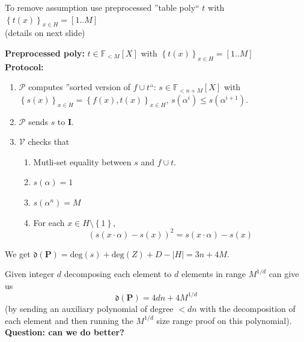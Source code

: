 \documentclass[shadesubsections,compress,14pt,mathserif]{beamer}
\newcommand{\prot}{\mathbf{P}}
\newcommand{\aggdeg}[1]{\mathfrak{d}(#1)}
\renewcommand{\deg}{\mathrm{deg}}
\newcommand{\F}{\ensuremath{\mathbb F}}
\newcommand{\set}[1]{\ensuremath{\left\{#1\right\}}}
\newcommand{\sett}[2]{\ensuremath{\left\{#1\right\}_{#2}}}
\newcommand{\ver}{\ensuremath{\mathcal{V}}}
\newcommand{\prv}{\ensuremath{\mathcal{P}}}
\newcommand{\polysofdeg}[1]{\F_{< #1}[X]}
\newcommand{\ideal}{\mathbf{I}}
\begin{document}
\begin{frame}
To remove assumption use preprocessed ''table poly`` $t$ with $\sett{t(x)}{x\in H}=[1..M]$\\
(details on next slide)
 \vspace{0.2in}



\end{frame}

\begin{frame}

\textbf{Preprocessed poly:} $t\in \polysofdeg{M}$ with $\sett{t(x)}{x\in H}=[1..M]$ \\ \pause
\textbf{Protocol:}
 \begin{enumerate}
 \item $\prv$ computes ''sorted version of $f\cup t$``: $s\in \polysofdeg{n+M}$ with
 $\sett{s(x)}{x\in H}=\sett{f(x),t(x)}{x\in H}$, $s(\alpha^i)\leq s(\alpha^{i+1})$.\pause
 \item $\prv$ sends $s$ to $\ideal$.\pause
 \item $\ver$ checks that
 \begin{enumerate}
  \item Mutli-set equality between $s$ and $f\cup t$.\pause
  \item $s(\alpha)=1$
  \item $s(\alpha^n) = M$
  \item For each $x\in H\setminus \set{1}$,\pause
  \[ (s(x\cdot \alpha) - s(x))^2 = s(x\cdot \alpha) - s(x)\]
 \end{enumerate}

\end{enumerate}


We get $\aggdeg{\prot}= \deg(s)+\deg(Z)+D-|H| = 3n+4M$.
\end{frame}
\begin{frame}
Given integer $d$ decomposing each element to $d$ elements in range $M^{1/d}$ can 
give us $$\aggdeg{\prot} = 4dn+4M^{1/d}$$(by sending an auxiliary polynomial of degree $<dn$ with the decomposition of each element and then running the $M^{1/d}$ size range proof on this polynomial).\\

 \vspace{0.2in}
\textbf{Question: can we do better?}


\end{frame}
\end{document}
